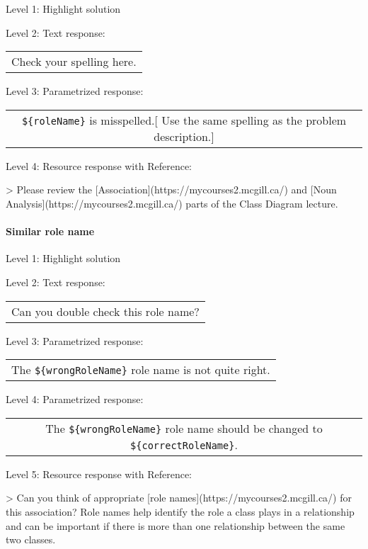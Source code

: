 \noindent Level 1: Highlight solution \medskip

\noindent Level 2: Text response: \medskip

\begin{tabular}{|c}
Check your spelling here.
\end{tabular} \medskip

\noindent Level 3: Parametrized response: \medskip

\begin{tabular}{|c}
\verb|${roleName}| is misspelled.[ Use the same spelling as the problem description.]
\end{tabular} \medskip

\noindent Level 4: Resource response with Reference:

> Please review the [Association](https://mycourses2.mcgill.ca/) and [Noun Analysis](https://mycourses2.mcgill.ca/) parts of the Class Diagram lecture.


\paragraph{Similar role name}

\noindent Level 1: Highlight solution \medskip

\noindent Level 2: Text response: \medskip

\begin{tabular}{|c}
Can you double check this role name?
\end{tabular} \medskip

\noindent Level 3: Parametrized response: \medskip

\begin{tabular}{|c}
The \verb|${wrongRoleName}| role name is not quite right.
\end{tabular} \medskip

\noindent Level 4: Parametrized response: \medskip

\begin{tabular}{|c}
The \verb|${wrongRoleName}| role name should be changed to \verb|${correctRoleName}|.
\end{tabular} \medskip

\noindent Level 5: Resource response with Reference:

> Can you think of appropriate [role names](https://mycourses2.mcgill.ca/)
for this association? Role names help identify the role a class plays in a
relationship and can be important if there is more than one relationship
between the same two classes.

